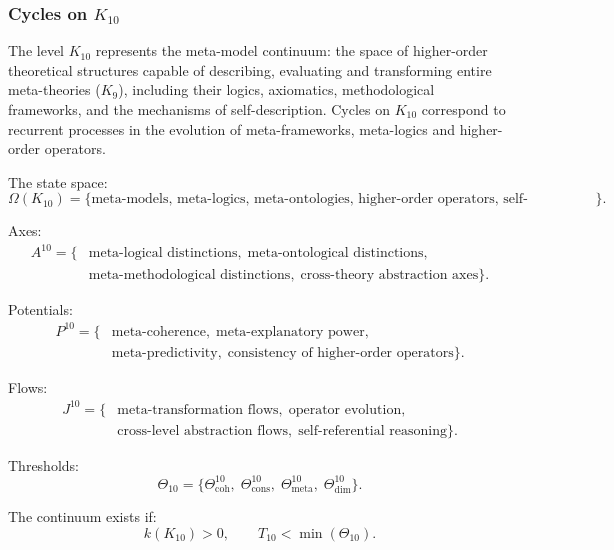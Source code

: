 
\subsubsection{Cycles on $K_{10}$}
\label{sec:cycles-k10}

The level $K_{10}$ represents the meta-model continuum: the space of
higher-order theoretical structures capable of describing, evaluating and
transforming entire meta-theories ($K_9$), including their logics,
axiomatics, methodological frameworks, and the mechanisms of
self-description. Cycles on $K_{10}$ correspond to recurrent processes in
the evolution of meta-frameworks, meta-logics and higher-order operators.

The state space:
\[
  \Omega(K_{10})
  = \{\text{meta-models, meta-logics, meta-ontologies,
      higher-order operators, self-descriptions}\}.
\]

Axes:
\[
  \begin{aligned}
  A^{10}
  = \{&
    \text{meta-logical distinctions},\;
    \text{meta-ontological distinctions},\\
    &\text{meta-methodological distinctions},\;
    \text{cross-theory abstraction axes}
  \}.
  \end{aligned}
\]

Potentials:
\[
  \begin{aligned}
  P^{10}
   = \{&
      \text{meta-coherence},\;
      \text{meta-explanatory power},\\
      &\text{meta-predictivity},\;
      \text{consistency of higher-order operators}
    \}.
  \end{aligned}
\]

Flows:
\[
  \begin{aligned}
  J^{10}
   = \{&
       \text{meta-transformation flows},\;
       \text{operator evolution},\\
       &\text{cross-level abstraction flows},\;
       \text{self-referential reasoning}
     \}.
  \end{aligned}
\]

Thresholds:
\[
  \Theta_{10}
  = \{
       \Theta^{10}_\mathrm{coh},\;
       \Theta^{10}_\mathrm{cons},\;
       \Theta^{10}_\mathrm{meta},\;
       \Theta^{10}_\mathrm{dim}
    \}.
\]

The continuum exists if:
\[
  k(K_{10})>0,\qquad T_{10} < \min(\Theta_{10}).
\]


